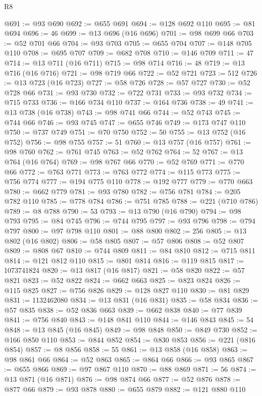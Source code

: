 \begin{lexlean}{R8}
\begin{coremodule}
@691 := @93 @690
@692 := @655 @691
@694 := @128 @692 @110
@695 := @81 @694
@696 := 46
@699 := @13 @696 (@16 @696)
@701 := @98 @699 @66
@703 := @52 @701 @66
@704 := @93 @703
@705 := @655 @704
@707 := @148 @705 @110
@708 := @695 @707
@709 := @682 @708
@710 := @146 @709
@711 := 47
@714 := @13 @711 (@16 @711)
@715 := @98 @714
@716 := 48
@719 := @13 @716 (@16 @716)
@721 := @98 @719 @66
@722 := @52 @721
@723 := 512
@726 := @13 @723 (@16 @723)
@727 := @58 @726
@728 := @57 @727
@730 := @52 @728 @66
@731 := @93 @730
@732 := @722 @731
@733 := @93 @732
@734 := @715 @733
@736 := @166 @734 @110
@737 := @164 @736
@738 := 49
@741 := @13 @738 (@16 @738)
@743 := @98 @741 @66
@744 := @52 @743
@745 := @744 @66
@746 := @93 @745
@747 := @655 @746
@749 := @173 @747 @110
@750 := @737 @749
@751 := @70 @750
@752 := 50
@755 := @13 @752 (@16 @752)
@756 := @98 @755
@757 := 51
@760 := @13 @757 (@16 @757)
@761 := @98 @760
@762 := @761 @745
@763 := @52 @762
@764 := 52
@767 := @13 @764 (@16 @764)
@769 := @98 @767 @66
@770 := @52 @769
@771 := @770 @66
@772 := @763 @771
@773 := @763 @772
@774 := @115 @773
@775 := @756 @774
@777 := @194 @775 @110
@778 := @192 @777
@779 := @770 @663
@780 := @662 @779
@781 := @93 @780
@782 := @756 @781
@784 := @205 @782 @110
@785 := @778 @784
@786 := @751 @785
@788 := @221 (@710 @786)
@789 := @8 @788
@790 := 53
@793 := @13 @790 (@16 @790)
@794 := @98 @793
@795 := @84 @745
@796 := @744 @795
@797 := @93 @796
@798 := @794 @797
@800 := @97 @798 @110
@801 := @88 @800
@802 := 256
@805 := @13 @802 (@16 @802)
@806 := @58 @805
@807 := @57 @806
@808 := @52 @807
@809 := @808 @67
@810 := @744 @809
@811 := @84 @810
@812 := @715 @811
@814 := @121 @812 @110
@815 := @801 @814
@816 := @119 @815
@817 := 1073741824
@820 := @13 @817 (@16 @817)
@821 := @58 @820
@822 := @57 @821
@823 := @52 @822
@824 := @662 @663
@825 := @823 @824
@826 := @115 @825
@827 := @756 @826
@829 := @128 @827 @110
@830 := @81 @829
@831 := 1132462080
@834 := @13 @831 (@16 @831)
@835 := @58 @834
@836 := @57 @835
@838 := @52 @836 @663
@839 := @662 @838
@840 := @77 @839
@841 := @756 @840
@843 := @148 @841 @110
@844 := @146 @843
@845 := 54
@848 := @13 @845 (@16 @845)
@849 := @98 @848
@850 := @849 @730
@852 := @166 @850 @110
@853 := @844 @852
@854 := @830 @853
@856 := @221 (@816 @854)
@857 := @8 @856
@858 := 55
@861 := @13 @858 (@16 @858)
@863 := @98 @861 @66
@864 := @52 @863
@865 := @864 @66
@866 := @93 @865
@867 := @655 @866
@869 := @97 @867 @110
@870 := @88 @869
@871 := 56
@874 := @13 @871 (@16 @871)
@876 := @98 @874 @66
@877 := @52 @876
@878 := @877 @66
@879 := @93 @878
@880 := @655 @879
@882 := @121 @880 @110

\end{coremodule}
\end{lexlean}
